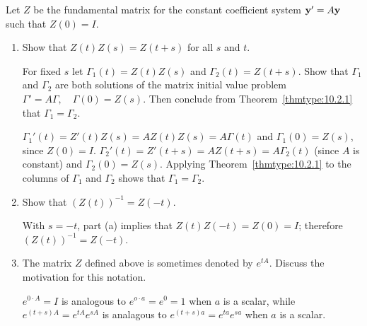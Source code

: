 \documentclass{ximera}
\begin{document}
\begin{problem}\label{exer:10.3.18}
Let $Z$ be the fundamental matrix for the constant coefficient system
 ${\bf y}'=A{\bf y}$ such that $Z(0)=I$.
\begin{enumerate}
\item %
Show that $Z(t)Z(s)=Z(t+s)$ for all $s$ and $t$. 
\begin{hint}
For
fixed
$s$ let $\Gamma_1(t)=Z(t)Z(s)$ and $\Gamma_2(t)=Z(t+s)$. Show that
$\Gamma_1$ and $\Gamma_2$ are both solutions of the matrix initial value
problem $\Gamma'=A\Gamma,\quad\Gamma(0)=Z(s)$. Then conclude from
Theorem~\ref{thmtype:10.2.1} that $\Gamma_1=\Gamma_2$.
\end{hint}

\begin{solution}
    $\Gamma_1'(t)=Z'(t)Z(s)=AZ(t)Z(s)=A\Gamma(t)$ and $\Gamma_1(0)=Z(s)$,
since $Z(0)=I$.
$\Gamma_2'(t)=Z'(t+s)=AZ(t+s)=A\Gamma_2(t)$ (since $A$ is constant)
and $\Gamma_2(0)=Z(s)$. Applying Theorem~\ref{thmtype:10.2.1}  to the columns of
$\Gamma_1$ and $\Gamma_2$  shows that $\Gamma_1=\Gamma_2$.
\end{solution}
\item %
Show that $(Z(t))^{-1}=Z(-t)$.

\begin{solution}
    With $s=-t$, part (a) implies that $Z(t)Z(-t)=Z(0)=I$;
therefore $(Z(t))^{-1}=Z(-t)$.
\end{solution}
\item %
The matrix $Z$ defined above is sometimes denoted by $e^{tA}$. Discuss
 the motivation for this notation.

 \begin{solution}
     $e^{0\cdot A}=I$ is analogous to $e^{o\cdot a}=e^{0}=1$ when
$a$ is a scalar, while $e^{(t+s)A}=e^{tA}e^{sA}$  is analagous
to $e^{(t+s)a}=e^{ta}e^{sa}$ when $a$ is a scalar.
 \end{solution}
\end{enumerate}
\end{problem}
\end{document}
